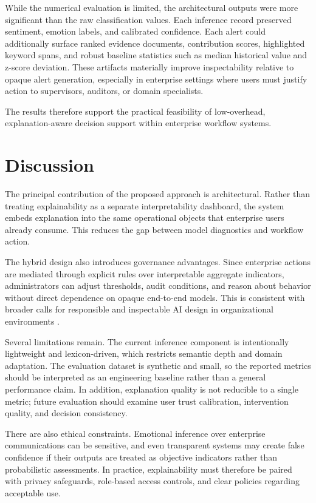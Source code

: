 \documentclass[conference]{IEEEtran}
\begin{document}
While the numerical evaluation is limited, the architectural outputs were more significant than the raw classification values. Each inference record preserved sentiment, emotion labels, and calibrated confidence. Each alert could additionally surface ranked evidence documents, contribution scores, highlighted keyword spans, and robust baseline statistics such as median historical value and z-score deviation. These artifacts materially improve inspectability relative to opaque alert generation, especially in enterprise settings where users must justify action to supervisors, auditors, or domain specialists.

The results therefore support the practical feasibility of low-overhead, explanation-aware decision support within enterprise workflow systems.

\section{Discussion}
The principal contribution of the proposed approach is architectural. Rather than treating explainability as a separate interpretability dashboard, the system embeds explanation into the same operational objects that enterprise users already consume. This reduces the gap between model diagnostics and workflow action.

The hybrid design also introduces governance advantages. Since enterprise actions are mediated through explicit rules over interpretable aggregate indicators, administrators can adjust thresholds, audit conditions, and reason about behavior without direct dependence on opaque end-to-end models. This is consistent with broader calls for responsible and inspectable AI design in organizational environments \cite{arrieta2020explainable}.

Several limitations remain. The current inference component is intentionally lightweight and lexicon-driven, which restricts semantic depth and domain adaptation. The evaluation dataset is synthetic and small, so the reported metrics should be interpreted as an engineering baseline rather than a general performance claim. In addition, explanation quality is not reducible to a single metric; future evaluation should examine user trust calibration, intervention quality, and decision consistency.

There are also ethical constraints. Emotional inference over enterprise communications can be sensitive, and even transparent systems may create false confidence if their outputs are treated as objective indicators rather than probabilistic assessments. In practice, explainability must therefore be paired with privacy safeguards, role-based access controls, and clear policies regarding acceptable use.
\end{document}
